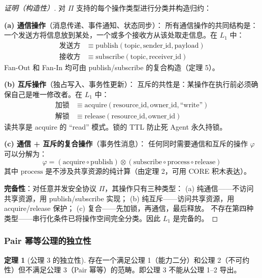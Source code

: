 \documentclass[11pt,a4paper]{article}
\theoremstyle{definition}
\newtheorem{theorem}{定理}[section]
\theoremstyle{definition}
\theoremstyle{remark}
\newcommand{\tensor}{\otimes}
\begin{document}
\begin{proof}[证明（构造性）]
对 $\Pi$ 支持的每个操作类型进行分类并构造归约：

\textbf{(a) 通信操作}（消息传递、事件通知、状态同步）：
所有通信操作的共同结构是：一个发送方将信息放到某处，一个或多个接收方从该处取走信息。在 $L_1$ 中：
\[
\begin{aligned}
\text{发送方} &\equiv \mathrm{publish}(\mathrm{topic}, \mathrm{sender\_id}, \mathrm{payload}) \\
\text{接收方} &\equiv \mathrm{subscribe}(\mathrm{topic}, \mathrm{receiver\_id})
\end{aligned}
\]
Fan-Out 和 Fan-In 均可由 publish/subscribe 的复合构造（定理 5）。

\textbf{(b) 互斥操作}（独占写入、事务性更新）：
互斥的共性是：某操作在执行前必须确保自己是唯一修改者。在 $L_1$ 中：
\[
\begin{aligned}
\text{加锁} &\equiv \mathrm{acquire}(\mathrm{resource\_id}, \mathrm{owner\_id}, \text{``write''}) \\
\text{解锁} &\equiv \mathrm{release}(\mathrm{resource\_id}, \mathrm{owner\_id})
\end{aligned}
\]
读共享是 acquire 的 ``read'' 模式。锁的 TTL 防止死 Agent 永久持锁。

\textbf{(c) 通信 + 互斥的复合操作}（事务性消息）：
任何同时需要通信和互斥的操作 $\varphi$ 可以分解为：
\[
\varphi = (\mathrm{acquire} \circ \mathrm{publish}) \tensor (\mathrm{subscribe} \circ \mathrm{process} \circ \mathrm{release})
\]
其中 $\mathrm{process}$ 是不涉及共享资源的纯计算（由定理 2，可用 CORE 积木表达）。

\textbf{完备性}：对任意并发安全协议 $\Pi$，其操作只有三种类型：
(a) 纯通信——不访问共享资源，用 publish/subscribe 实现；
(b) 纯互斥——访问共享资源，用 acquire/release 保护；
(c) 复合——先加锁，再通信，最后释放。
不存在第四种类型——串行化条件已将操作空间完全分类。因此 $L_1$ 是完备的。
\end{proof}

\subsubsection{Pair 幂等公理的独立性}

\begin{theorem}[公理 3 的独立性]\label{thm:axiom3-independence}
存在一个满足公理 1（能力二分）和公理 2（不可约性）但不满足公理 3（Pair 幂等）的范畴。即公理 3 不能从公理 1--2 导出。
\end{theorem}
\end{document}
